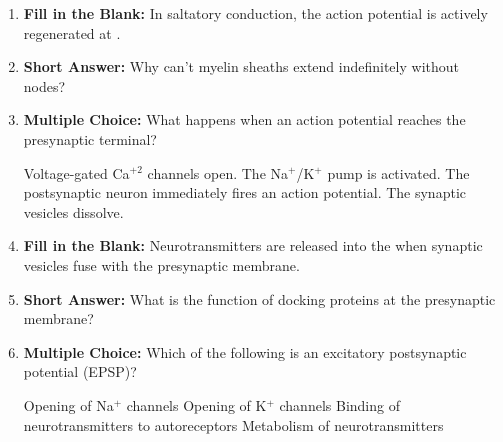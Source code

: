 \begin{enumerate}[label=\textbf{Q2.3.\arabic*}]
      \item \textbf{Fill in the Blank:} In saltatory conduction, the action potential is actively regenerated at \underline{\hspace{3cm}}. \\

      \item \textbf{Short Answer:} Why can't myelin sheaths extend indefinitely without nodes? \\

      \item \textbf{Multiple Choice:} What happens when an action potential reaches the presynaptic terminal?
            \begin{tasks}
                  \task Voltage-gated Ca\(^{+2}\) channels open.
                  \task The Na\(^+\)/K\(^+\) pump is activated.
                  \task The postsynaptic neuron immediately fires an action potential.
                  \task The synaptic vesicles dissolve.
            \end{tasks}

      \item \textbf{Fill in the Blank:} Neurotransmitters are released into the \underline{\hspace{3cm}} when synaptic vesicles fuse with the presynaptic membrane. \\

      \item \textbf{Short Answer:} What is the function of docking proteins at the presynaptic membrane? \\

      \item \textbf{Multiple Choice:} Which of the following is an excitatory postsynaptic potential (EPSP)?
            \begin{tasks}
                  \task Opening of Na\(^+\) channels
                  \task Opening of K\(^+\) channels
                  \task Binding of neurotransmitters to autoreceptors
                  \task Metabolism of neurotransmitters
            \end{tasks}


\end{enumerate}
